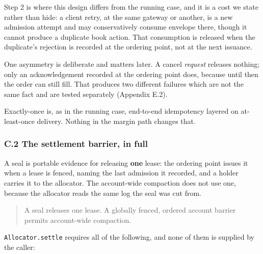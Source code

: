 \documentclass[10pt,a4paper]{article}
\newcounter{none}  %
\begin{document}
Step 2 is where this design differs from the running case, and it is a cost we
state rather than hide: a client retry, at the same gateway or another, is a new
admission attempt and may conservatively consume envelope there, though it
cannot produce a duplicate book action. That consumption is released when the
duplicate's rejection is recorded at the ordering point, not at the next issuance.

One asymmetry is deliberate and matters later. A cancel \emph{request} releases
nothing; only an acknowledgement recorded at the ordering point does, because
until then the order can still fill. That produces two different failures which
are not the same fact and are tested separately (Appendix E.2).

Exactly-once is, as in the running case, end-to-end idempotency layered on
at-least-once delivery. Nothing in the margin path changes that.

\subsubsection{C.2 The settlement barrier, in full}\label{c.2-the-settlement-barrier-in-full}

A seal is portable evidence for releasing \textbf{one} lease: the ordering point
issues it when a lease is fenced, naming the last admission it recorded, and a
holder carries it to the allocator. The account-wide compaction does not use one,
because the allocator reads the same log the seal was cut from.

\begin{quote}
A seal releases one lease. A globally fenced, ordered account barrier permits
account-wide compaction.
\end{quote}

\texttt{Allocator.settle} requires all of the following, and none of them is supplied by
the caller:
\end{document}
